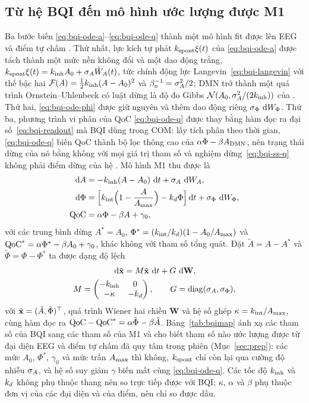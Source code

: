 \subsection{Từ hệ BQI đến mô hình ước lượng được M1}
\label{sec:theory-m1}
Ba bước biến \eqref{eq:bqi-ode-a}--\eqref{eq:bqi-ode-q} thành một mô hình fit được lên EEG và điểm tự chấm \cite{companion}. Thứ nhất, lực kích tự phát $k_{\mathrm{spont}}\xi(t)$ của \eqref{eq:bqi-ode-a} được tách thành một mức nền không đổi và một dao động trắng, $k_{\mathrm{spont}}\xi(t)=k_{\mathrm{inh}} A_0+\sigma_{A}\dot W_A(t)$, tức chính động lực Langevin~\eqref{eq:bqi-langevin} với thế bậc hai $\mathcal F(A)=\tfrac12k_{\mathrm{inh}}(A-A_0)^2$ và $\beta_{\mathrm n}^{-1}=\sigma_{A}^2/2$; DMN trở thành một quá trình Ornstein--Uhlenbeck có luật dừng là độ đo Gibbs $\mathcal N(A_0,\sigma_{A}^2/(2k_{\mathrm{inh}}))$ của \cite[pt.~(85)]{BQI}. Thứ hai, \eqref{eq:bqi-ode-phi} được giữ nguyên và thêm dao động riêng $\sigma_{\Phi}\,\,\mathrm{d} W_\Phi$. Thứ ba, phương trình vi phân của QoC \eqref{eq:bqi-ode-q} được thay bằng hàm đọc ra đại số~\eqref{eq:bqi-readout} mà BQI dùng trong COM: lấy tích phân theo thời gian, \eqref{eq:bqi-ode-q} biến QoC thành bộ lọc thông cao của $\alpha\Phi-\beta A_{\mathrm{DMN}}$, nên trạng thái dừng của nó bằng không với mọi giá trị tham số và nghiệm dừng~\eqref{eq:bqi-ss-q} \cite[pt.~(57)]{BQI} không phải điểm dừng của hệ \cite{companion}. Mô hình M1 thu được là
\begin{align}
  \,\mathrm{d} A&=-k_{\mathrm{inh}}(A-A_0)\,\,\mathrm{d} t+\sigma_{A}\,\,\mathrm{d} W_A, \label{eq:m1-a}\\
  \,\mathrm{d}\Phi&=\Bigl[k_{\mathrm{int}}\Bigl(1-\frac{A}{A_{\max}}\Bigr)-k_{d}\Phi\Bigr]\,\mathrm{d} t+\sigma_{\Phi}\,\,\mathrm{d} W_\Phi, \label{eq:m1-phi}\\
  \mathrm{QoC}&=\alpha\Phi-\beta A+\gamma_0, \label{eq:m1-q}
\end{align}
với các trung bình dừng $A^*=A_0$, $\Phi^*=(k_{\mathrm{int}}/k_{d})(1-A_0/A_{\max})$ và $\mathrm{QoC}^*=\alpha\Phi^*-\beta A_0+\gamma_0$, khác không với tham số tổng quát. Đặt $\tilde A=A-A^*$ và $\tilde\Phi=\Phi-\Phi^*$ ta được dạng độ lệch
\begin{equation}
  \begin{gathered}
  \,\mathrm{d}\tilde{\mathbf{x}}=M\tilde{\mathbf{x}}\,\,\mathrm{d} t+G\,\,\mathrm{d}\mathbf W,\\
  M=\begin{pmatrix}-k_{\mathrm{inh}}&0\\-\kappa&-k_{d}\end{pmatrix},\qquad
  G=\operatorname{diag}(\sigma_{A},\sigma_{\Phi}),
  \end{gathered}
  \label{eq:m1}
\end{equation}
với $\tilde{\mathbf{x}}=(\tilde A,\tilde\Phi)^\top$, quá trình Wiener hai chiều $\mathbf W$ và hệ số ghép $\kappa=k_{\mathrm{int}}/A_{\max}$, cùng hàm đọc ra $\mathrm{QoC}-\mathrm{QoC}^*=\alpha\tilde\Phi-\beta\tilde A$. Bảng~\ref{tab:bqimap} ánh xạ các tham số của BQI sang các tham số của M1 và cho biết tham số nào ước lượng được từ đại diện EEG và điểm tự chấm đã quy tâm trong phiên (Mục~\ref{sec:prep}): các mức $A_0$, $\Phi^*$, $\gamma_0$ và mức trần $A_{\max}$ thì không, $k_{\mathrm{spont}}$ chỉ còn lại qua cường độ nhiễu $\sigma_{A}$, và hệ số suy giảm $\gamma$ biến mất cùng \eqref{eq:bqi-ode-q}. Các tốc độ $k_{\mathrm{inh}}$ và $k_{d}$ không phụ thuộc thang nên so trực tiếp được với BQI; $\kappa$, $\alpha$ và $\beta$ phụ thuộc đơn vị của các đại diện và của điểm, nên chỉ so được dấu.


